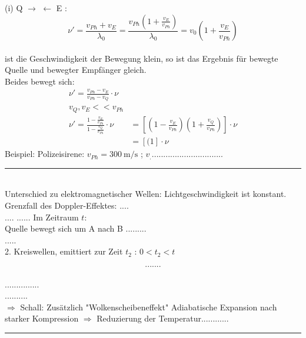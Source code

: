 (i) Q $ \rightarrow $ $ \leftarrow $ E :\\
$$ \nu'  = \frac{v_{Ph}+v_E}{\lambda_0} = \frac{v_{Ph}(1+\frac{v_E}{v_{Ph}})}{\lambda_0}=v_0(1+\frac{v_E}{v_{Ph}})$$\\
ist die Geschwindigkeit der Bewegung klein, so ist das Ergebnis für bewegte Quelle und bewegter Empfänger gleich.\\
Beides bewegt sich: \bild
\begin{align*}
\nu'=\frac{v_{Ph}-v_E}{v_{Ph}-v_Q} \cdot \nu \\
v_Q,v_E << v_{Ph}\\
\nu'=\frac{1-\frac{v_E}{v_{Ph}}}{1-\frac{v_Q}{v_{Ph}}} \cdot \nu &= \left[ (1-\frac{v_E}{v_{Ph}}) (1+\frac{v_Q}{v_{Ph}})  \right] \cdot \nu \\
&= \left[ (1  \right] \cdot \nu
\end{align*}
\bild
Beispiel: Polizeisirene: $ v_{Ph} = \SI{300}{\meter\per\second} $ ; $ v_................................ $ 
\rule{5cm}{.2pt}\\
Unterschied zu elektromagnetischer Wellen: Lichtgeschwindigkeit ist konstant.\\
Grenzfall des Doppler-Effektes: $ .... $\\
....
\bild
......
\bild
Im Zeitraum $ t $:\\
Quelle bewegt sich um A nach B \hspace{1cm} .........\\
.....\\
2. Kreiswellen, emittiert zur Zeit $ t_2 $ : $ 0<t_2<t $

$$ ....... $$\\
...............\\
..........\\
$ \Rightarrow $ Schall:
\bild
Zusätzlich "Wolkenscheibeneffekt"
Adiabatische Expansion nach starker Kompression $ \Rightarrow $ Reduzierung der Temperatur............
\bild
\rule{5cm}{.2pt}

